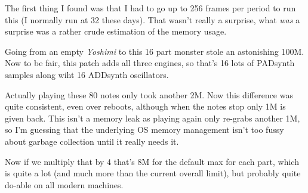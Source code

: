    The first thing I found was that I had to go up to 256 frames per period to
   run this (I normally run at 32 these days). That wasn't really a surprise,
   what \textsl{was} a surprise was a rather crude estimation of the memory
   usage.

   Going from an empty \textsl{Yoshimi} to this 16 part monster stole an astonishing
   100M. Now to be fair, this patch adds all three engines, so that's 16 lots of
   PADsynth samples along wiht 16 ADDsynth oscillators.

   Actually playing these 80 notes only took another 2M. Now this difference
   was quite consistent, even over reboots, although when the notes stop only
   1M is given back. This isn't a memory leak as playing again only re-grabs
   another 1M, so I'm guessing that the underlying OS memory management isn't
   too fussy about garbage collection until it really needs it.

   Now if we multiply that by 4 that's 8M for the default max for each part,
   which is quite a lot (and much more than the current overall limit), but
   probably quite do-able on all modern machines.

